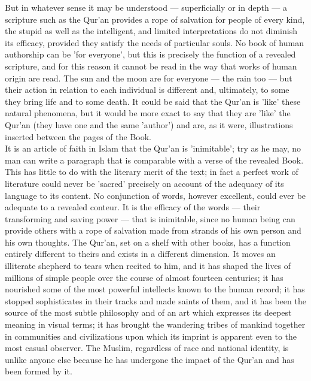 \documentclass[10pt, twoside]{book}
\begin{document}
But in whatever sense it may be understood --- superficially or in depth --- a scripture such as the 
Qur'an provides a rope of salvation for people of every kind, the stupid as well as the intelligent, 
and limited interpretations do not diminish its efficacy, provided they satisfy the needs of 
particular souls. No book of human authorship can be 'for everyone', but this is precisely the 
function of a revealed scripture, and for this reason it cannot be read in the way that works of 
human origin are read. The sun and the moon are for everyone --- the rain too --- but their action in 
relation to each individual is different and, ultimately, to some they bring life and to some death. 
It could be said that the Qur'an is 'like' these natural phenomena, but it would be more exact to say 
that they are 'like' the Qur'an (they have one and the same 'author') and are, as it were, illustrations inserted between the pages of the Book. \\

It is an article of faith in Islam that the Qur'an is 'inimitable'; try as he may, no man can write a 
paragraph that is comparable with a verse of the revealed Book. This has little to do with the 
literary merit of the text; in fact a perfect work of literature could never be 'sacred' precisely on 
account of the adequacy of its language to its content. No conjunction of words, however excellent, 
could ever be adequate to a revealed conteur. It is the efficacy of the words --- their transforming 
and saving power --- that is inimitable, since no human being can provide others with a rope of 
salvation made from strands of his own person and his own thoughts. The Qur'an, set on a shelf with 
other books, has a function entirely different to theirs and exists in a different dimension. It 
moves an illiterate shepherd to tears when recited to him, and it has shaped the lives of millions of 
simple people over the course of almost fourteen centuries; it has nourished some of the most 
powerful intellects known to the human record; it has stopped sophisticates in their tracks and made 
saints of them, and it has been the source of the most subtle philosophy and of an art which 
expresses its deepest meaning in visual terms; it has brought the wandering tribes of mankind 
together in communities and civilizations upon which its imprint is apparent even to the most casual 
observer. The Muslim, regardless of race and national identity, is unlike anyone else because he has 
undergone the impact of the Qur'an and has been formed by it. \\
\end{document}
